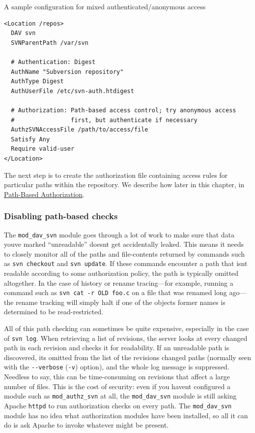 \protect{}\label{svn.serverconfig.httpd.authz.perdir.ex-3}
A sample configuration for mixed authenticated/anonymous access

\begin{verbatim}
<Location /repos>
  DAV svn
  SVNParentPath /var/svn

  # Authentication: Digest
  AuthName "Subversion repository"
  AuthType Digest
  AuthUserFile /etc/svn-auth.htdigest

  # Authorization: Path-based access control; try anonymous access
  #                first, but authenticate if necessary
  AuthzSVNAccessFile /path/to/access/file
  Satisfy Any
  Require valid-user
</Location>
\end{verbatim}

The next step is to create the authorization file containing access
rules for particular paths within the repository. We describe how later
in this chapter, in
\hyperref[svn.serverconfig.pathbasedauthz]{Path-Based Authorization}.

\subsubsection{Disabling path-based
checks}\label{svn.serverconfig.httpd.authz.pathauthzoff}

The \texttt{mod\_dav\_svn} module goes through a lot of work to make
sure that data you\textquotesingle ve marked ``unreadable''
doesn\textquotesingle t get accidentally leaked. This means it needs to
closely monitor all of the paths and file-contents returned by commands
such as \texttt{svn\ checkout} and \texttt{svn\ update}. If these
commands encounter a path that isn\textquotesingle t readable according
to some authorization policy, the path is typically omitted altogether.
In the case of history or rename tracing---for example, running a
command such as \texttt{svn\ cat\ -r\ OLD\ foo.c} on a file that was
renamed long ago---the rename tracking will simply halt if one of the
object\textquotesingle s former names is determined to be
read-restricted.

All of this path checking can sometimes be quite expensive, especially
in the case of \texttt{svn\ log}. When retrieving a list of revisions,
the server looks at every changed path in each revision and checks it
for readability. If an unreadable path is discovered,
it\textquotesingle s omitted from the list of the
revision\textquotesingle s changed paths (normally seen with the
\texttt{-\/-verbose} (\texttt{-v}) option), and the whole log message is
suppressed. Needless to say, this can be time-consuming on revisions
that affect a large number of files. This is the cost of security: even
if you haven\textquotesingle t configured a module such as
\texttt{mod\_authz\_svn} at all, the \texttt{mod\_dav\_svn} module is
still asking Apache \texttt{httpd} to run authorization checks on every
path. The \texttt{mod\_dav\_svn} module has no idea what authorization
modules have been installed, so all it can do is ask Apache to invoke
whatever might be present.

